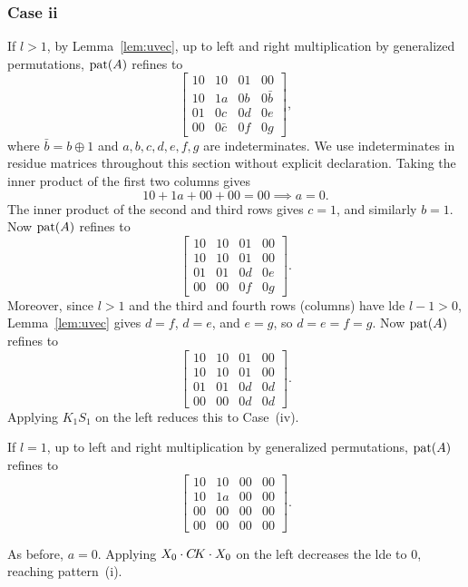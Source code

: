 \documentclass[reprint,amsmath,amssymb,aps,pra]{revtex4-2}
\begin{document}
\subsubsection{Case ii}
If $l>1$, by Lemma~\ref{lem:uvec}, up to left and right multiplication
by generalized permutations, $\operatorname{pat}(A)$ refines to
\[
  \begin{bmatrix}
    10 & 10       & 01 & 00       \\
    10 & 1a       & 0b & 0\bar{b} \\
    01 & 0c       & 0d & 0e       \\
    00 & 0\bar{c} & 0f & 0g
  \end{bmatrix},
\]
where $\bar{b}=b\oplus 1$ and $a,b,c,d,e,f,g$ are indeterminates. We use
indeterminates in residue matrices throughout this section without
explicit declaration. Taking the inner product of the first two
columns gives
\[10 + 1a + 00 + 00 = 00 \implies a = 0.\] The inner product of the
second and third rows gives $c = 1$, and similarly $b = 1$. Now
$\operatorname{pat}(A)$ refines to
\[
  \begin{bmatrix}
    10 & 10 & 01 & 00 \\
    10 & 10 & 01 & 00 \\
    01 & 01 & 0d & 0e \\
    00 & 00 & 0f & 0g
  \end{bmatrix}.
\]
Moreover, since $l>1$ and the third and fourth rows (columns) have lde
$l-1>0$, Lemma~\ref{lem:uvec} gives $d=f$, $d=e$, and $e=g$, so
$d=e=f=g$. Now $\operatorname{pat}(A)$ refines to
\[
  \begin{bmatrix}
    10 & 10 & 01 & 00 \\
    10 & 10 & 01 & 00 \\
    01 & 01 & 0d & 0d \\
    00 & 00 & 0d & 0d
  \end{bmatrix}.
\]
Applying $K_1 S_1$ on the left reduces this to Case~(iv).

If $l=1$, up to left and right multiplication by generalized
permutations, $\operatorname{pat}(A)$ refines to
\[
  \begin{bmatrix}
    10 & 10 & 00 & 00 \\
    10 & 1a & 00 & 00 \\
    00 & 00 & 00 & 00 \\
    00 & 00 & 00 & 00
  \end{bmatrix}.
\]

As before, $a=0$. Applying $X_0 \cdot C\kern-.16667em K \cdot X_0$ on the left
decreases the lde to 0, reaching pattern~(i).
\end{document}
